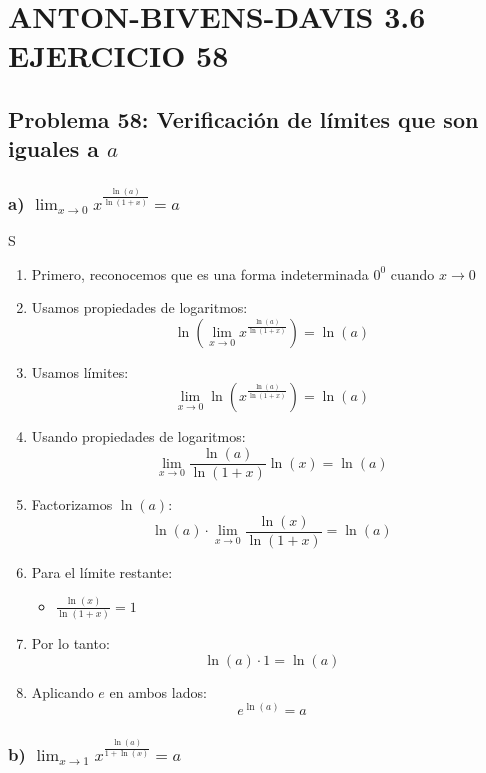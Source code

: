 \chapter*{ANTON-BIVENS-DAVIS 3.6 EJERCICIO 58}

\section*{Problema 58: Verificación de límites que son \\ iguales a $a$}

\subsection*{a)  $\lim_{x \to 0} x^{\frac{\ln(a)}{\ln(1+x)}} = a$}
S
\begin{enumerate}
    \item Primero, reconocemos que es una forma indeterminada $0^0$ cuando $x \to 0$
    
    \item Usamos propiedades de logaritmos:
    \[\ln(\lim_{x \to 0} x^{\frac{\ln(a)}{\ln(1+x)}}) = \ln(a)\]
    
    \item Usamos límites:
    \[\lim_{x \to 0} \ln(x^{\frac{\ln(a)}{\ln(1+x)}}) = \ln(a)\]
    
    \item Usando propiedades de logaritmos:
    \[\lim_{x \to 0} \frac{\ln(a)}{\ln(1+x)}\ln(x) = \ln(a)\]
    
    \item Factorizamos $\ln(a)$:
    \[\ln(a) \cdot \lim_{x \to 0} \frac{\ln(x)}{\ln(1+x)} = \ln(a)\]
    
    \item Para el límite restante:
    \begin{itemize}
        \item $\frac{\ln(x)}{\ln(1+x)} = 1$
    \end{itemize}
    
    \item Por lo tanto:
    \[\ln(a) \cdot 1 = \ln(a)\]
    
    \item Aplicando $e$ en ambos lados:
    \[e^{\ln(a)} = a\]
\end{enumerate}

\subsection*{b)  $\lim_{x \to 1} x^{\frac{\ln(a)}{1+\ln(x)}} = a$}


